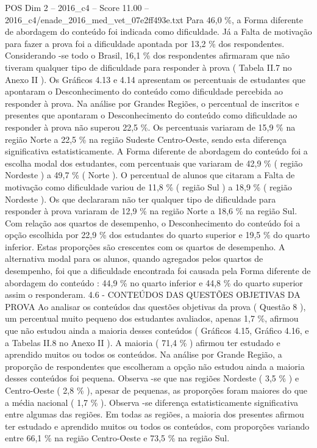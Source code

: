 \begin{textsample}{POS Dim 2 – 2016\_c4 – Score 11.00 – 2016\_c4/enade\_2016\_med\_vet\_07e2ff493e.txt}
Para 46,0 \%, a Forma diferente de abordagem do conteúdo foi indicada como dificuldade.
Já a Falta de motivação para fazer a prova foi a dificuldade apontada por 13,2 \% dos respondentes.
Considerando -se todo o Brasil, 16,1 \% dos respondentes afirmaram que não tiveram qualquer tipo de dificuldade para responder à prova ( Tabela II.7 no Anexo II ).
Os Gráficos 4.13 e 4.14 apresentam os percentuais de estudantes que apontaram o Desconhecimento do conteúdo como dificuldade percebida ao responder à prova.
Na análise por Grandes Regiões, o percentual de inscritos e presentes que apontaram o Desconhecimento do conteúdo como dificuldade ao responder à prova não superou 22,5 \%.
Os percentuais variaram de 15,9 \% na região Norte a 22,5 \% na região Sudeste Centro-Oeste, sendo esta diferença significativa estatisticamente.
A Forma diferente de abordagem do conteúdo foi a escolha modal dos estudantes, com percentuais que variaram de 42,9 \% ( região Nordeste ) a 49,7 \% ( Norte ).
O percentual de alunos que citaram a Falta de motivação como dificuldade variou de 11,8 \% ( região Sul ) a 18,9 \% ( região Nordeste ).
Os que declararam não ter qualquer tipo de dificuldade para responder à prova variaram de 12,9 \% na região Norte a 18,6 \% na região Sul.
Com relação aos quartos de desempenho, o Desconhecimento do conteúdo foi a opção escolhida por 22,9 \% dos estudantes do quarto superior e 19,5 \% do quarto inferior.
Estas proporções são crescentes com os quartos de desempenho.
A alternativa modal para os alunos, quando agregados pelos quartos de desempenho, foi que a dificuldade encontrada foi causada pela Forma diferente de abordagem do conteúdo : 44,9 \% no quarto inferior e 44,8 \% do quarto superior assim o responderam. 4.6 - CONTEÚDOS DAS QUESTÕES OBJETIVAS DA PROVA Ao analisar os conteúdos das questões objetivas da prova ( Questão 8 ), um percentual muito pequeno dos estudantes avaliados, apenas 1,7 \%, afirmou que não estudou ainda a maioria desses conteúdos ( Gráficos 4.15, Gráfico 4.16, e a Tabelas II.8 no Anexo II ).
A maioria ( 71,4 \% ) afirmou ter estudado e aprendido muitos ou todos os conteúdos.
Na análise por Grande Região, a proporção de respondentes que escolheram a opção não estudou ainda a maioria desses conteúdos foi pequena.
Observa -se que nas regiões Nordeste ( 3,5 \% ) e Centro-Oeste ( 2,8 \% ), apesar de pequenas, as proporções foram maiores do que a média nacional ( 1,7 \% ).
Observa -se diferença estatisticamente significativa entre algumas das regiões.
Em todas as regiões, a maioria dos presentes afirmou ter estudado e aprendido muitos ou todos os conteúdos, com proporções variando entre 66,1 \% na região Centro-Oeste e 73,5 \% na região Sul.

\end{textsample}
